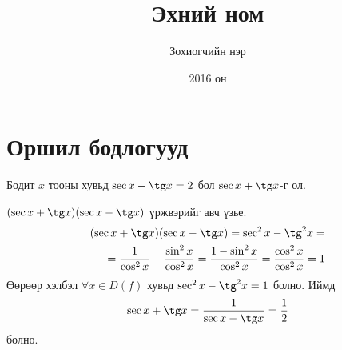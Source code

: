 \documentclass[10pt,a4paper,oneside]{book}
\begin{document}
\title{Эхний ном}
\author{Зохиогчийн нэр}
\date{2016 он}
\maketitle
\chapter{Оршил бодлогууд}

\Problem Бодит $x$ тооны хувьд $\sec x - \tg x = 2$ бол $\sec x + \tg x$-г ол.

\Solution
$(\sec x + \tg x)(\sec x - \tg x)$ үржвэрийг авч үзье.
\begin{equation*}
\begin{split}
(\sec x + \tg x)(\sec x - \tg x)= \sec^2 x - \tg^2 x =\\
= \frac{1}{\cos^2 x} - \frac{\sin^2 x}{\cos^2 x}
= \frac{1-\sin^2 x}{\cos^2 x} = \frac{\cos^2 x}{\cos^2 x} = 1
\end{split}
\end{equation*}
Өөрөөр хэлбэл $\forall x \in D(f)$ хувьд $\sec^2 x - \tg^2 x = 1$ болно. Иймд 
\begin{equation*}
\sec x + \tg x = \frac{1}{\sec x - \tg x} = \frac{1}{2}
\end{equation*}
 болно.
\end{document}
